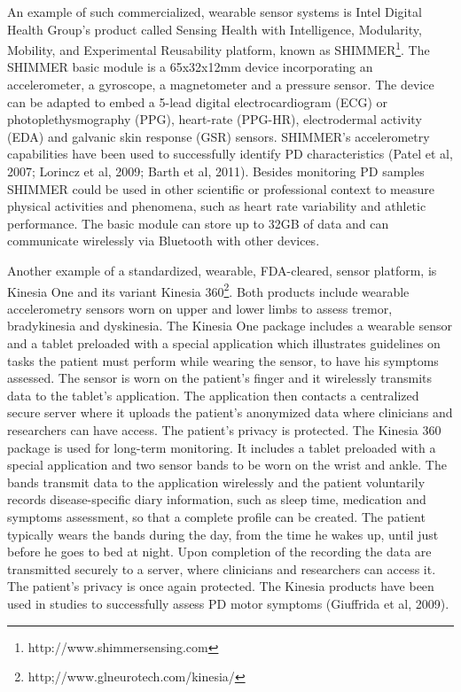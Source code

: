 An example of such commercialized, wearable sensor systems is Intel Digital Health Group's product called Sensing Health with Intelligence, Modularity, Mobility, and Experimental Reusability platform, known as \gls{SHIMMER}\footnote{http://www.shimmersensing.com}. The \gls{SHIMMER} basic module is a 65x32x12mm device incorporating an accelerometer, a gyroscope, a magnetometer and a pressure sensor. The device can be adapted to embed a 5-lead digital electrocardiogram (\gls{ECG}) or photoplethysmography (\gls{PPG}), heart-rate (\gls{PPG-HR}), electrodermal activity (\gls{EDA}) and galvanic skin response (\gls{GSR}) sensors. \gls{SHIMMER}'s accelerometry capabilities have been used to successfully identify \gls{PD} characteristics (Patel et al, 2007; Lorincz et al, 2009; Barth et al, 2011). Besides monitoring \gls{PD} samples \gls{SHIMMER} could be used in other scientific or professional context to measure physical activities and phenomena, such as heart rate variability and athletic performance. The basic module can store up to 32GB of data and can communicate wirelessly via Bluetooth with other devices. 

Another example of a standardized, wearable, FDA-cleared, sensor platform, is Kinesia One and its variant Kinesia 360\footnote{http;//www.glneurotech.com/kinesia/}. Both products include wearable accelerometry sensors worn on upper and lower limbs to assess tremor, bradykinesia and dyskinesia. The Kinesia One package includes a wearable sensor and a tablet preloaded with a special application which illustrates guidelines on tasks the patient must perform while wearing the sensor, to have his symptoms assessed. The sensor is worn on the patient's finger and it wirelessly transmits data to the tablet's application. The application then contacts a centralized secure server where it uploads the patient's anonymized data where clinicians and researchers can have access. The patient's privacy is protected. The Kinesia 360 package is used for long-term monitoring. It includes a tablet preloaded with a special application and two sensor bands to be worn on the wrist and ankle. The bands transmit data to the application wirelessly and the patient voluntarily records disease-specific diary information, such as sleep time, medication and symptoms assessment, so that a complete profile can be created. The patient typically wears the bands during the day, from the time he wakes up, until just before he goes to bed at night. Upon completion of the recording the data are transmitted securely to a server, where clinicians and researchers can access it. The patient's privacy is once again protected. The Kinesia products have been used in studies to successfully assess \gls{PD} motor symptoms (Giuffrida et al, 2009).


